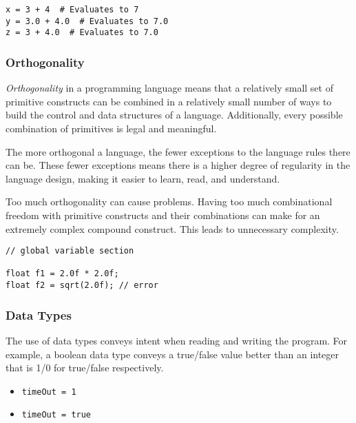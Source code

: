 \begin{verbatim}
x = 3 + 4  # Evaluates to 7
y = 3.0 + 4.0  # Evaluates to 7.0
z = 3 + 4.0  # Evaluates to 7.0
\end{verbatim}

\subsubsection{Orthogonality}\label{subsubsec:Orthogonality}
\begin{definition}[Orthogonality]\label{def:Orthogonality}
  \emph{Orthogonality} in a programming language means that a relatively small set of primitive constructs can be combined in a relatively small number of ways to build the control and data structures of a language.
  Additionally, every possible combination of primitives is legal and meaningful.

  The more orthogonal a language, the fewer exceptions to the language rules there can be.
  These fewer exceptions means there is a higher degree of regularity in the language design, making it easier to learn, read, and understand.

  \begin{remark}\label{rmk:Over_Orthogonality}
    Too much orthogonality can cause problems.
    Having too much combinational freedom with primitive constructs and their combinations can make for an extremely complex compound construct.
    This leads to unnecessary complexity.
  \end{remark}
\end{definition}

\begin{verbatim}
// global variable section

float f1 = 2.0f * 2.0f;
float f2 = sqrt(2.0f); // error
\end{verbatim}

\subsubsection{Data Types}\label{subsubsec:Data_Types}
The use of data types conveys intent when reading and writing the program.
For example, a boolean data type conveys a true/false value better than an integer that is 1/0 for true/false respectively.
\begin{itemize}[noitemsep]
\item \texttt{timeOut = 1}
\item \texttt{timeOut = true}
\end{itemize}

